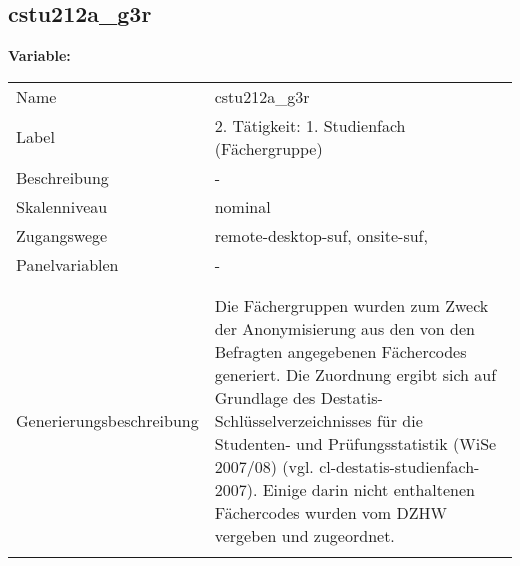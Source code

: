 	
	
	\subsection{cstu212a\_g3r}
	\label{subSection:cstu212a_g3r}

	\noindent\textbf{Variable:}\\
		\begin{tabular}{lL{11.3cm}}
			\label{tableVariable:cstu212a_g3r}
			Name & cstu212a\_g3r \\
			Label & 2. Tätigkeit: 1. Studienfach (Fächergruppe) \\
			Beschreibung & - \\
			Skalenniveau & nominal \\
			Zugangswege &
				remote-desktop-suf,
				onsite-suf,
 \\
			Panelvariablen & -
			 \\
			 \\
 \\
					Generierungsbeschreibung & Die Fächergruppen wurden zum Zweck der Anonymisierung aus den von den Befragten angegebenen Fächercodes generiert. Die Zuordnung ergibt sich auf Grundlage des Destatis-Schlüsselverzeichnisses für die Studenten- und Prüfungsstatistik (WiSe 2007/08) (vgl. cl-destatis-studienfach-2007).  Einige darin nicht enthaltenen Fächercodes wurden vom DZHW vergeben und zugeordnet. 
				 \\	
			 \\
		\end{tabular}







